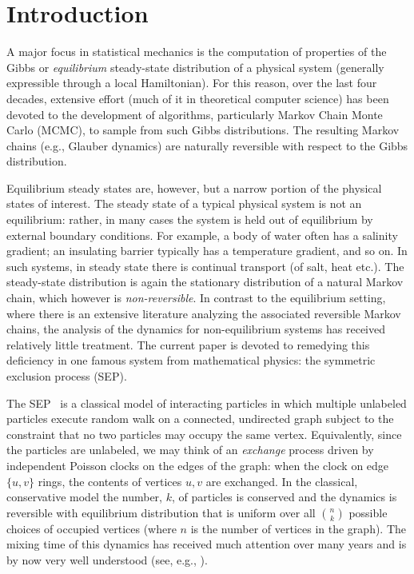 \documentclass[11pt]{article}
\theoremstyle{plain}
\theoremstyle{definition}
\theoremstyle{remark}
\numberwithin{equation}{section}
\begin{document}
\section{Introduction}
A major focus in statistical mechanics is the computation of properties of the Gibbs or \emph{equilibrium} steady-state distribution of a physical system (generally expressible through a local Hamiltonian). For this reason, over the last four decades, extensive effort (much of it in theoretical computer science) has been devoted to the development of algorithms, particularly Markov Chain Monte Carlo (MCMC), to sample from such Gibbs distributions.  The resulting Markov chains (e.g., Glauber dynamics) are naturally reversible with respect to the Gibbs distribution.

Equilibrium steady states are, however, but a narrow portion of the physical states of interest. The steady state of a typical physical system is not an equilibrium: rather, in many cases the system is held out of equilibrium by external boundary conditions. For example, a body of water often has a salinity gradient; an insulating barrier typically has a temperature gradient, and so on. In such systems, in steady state there is continual transport (of salt, heat etc.).  The steady-state distribution is again the stationary distribution of a natural Markov chain, which however is {\it non-reversible}.  In contrast to the equilibrium setting, where there is an extensive literature analyzing the associated reversible Markov chains, the analysis of the dynamics for non-equilibrium systems has received relatively little treatment. The current paper is devoted to remedying this deficiency in one famous system from mathematical physics: the symmetric exclusion process (SEP).

The SEP~\cite{Spitzer70,Liggett85} is a classical model of interacting particles
in which multiple unlabeled particles execute random walk on a connected, undirected 
graph subject to the constraint that no two particles may occupy the same vertex.  Equivalently, since the particles are unlabeled,
we may think of an {\it exchange\/} process driven by independent Poisson clocks
on the edges of the graph: when the clock on edge $\{u,v\}$ rings, the contents of vertices $u,v$ are exchanged.
In the classical, conservative model the number, $k$, of particles is conserved and the dynamics is
reversible with equilibrium distribution that is uniform over all $n\choose k$ possible choices of occupied 
vertices (where $n$ is the number of vertices in the graph).  
The mixing time of this dynamics has received much attention over many
years and is by now very well understood (see, e.g., \cite{Morris06,CLR10,Oliveira13,Lacoin1,Lacoin2,HP20}).
\end{document}
